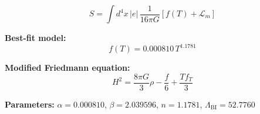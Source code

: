 
\begin{equation}
  S = \int d^4x \, |e| \, \frac{1}{16\pi G} \left[ f(T) + \mathcal{L}_m \right]
\end{equation}

\textbf{Best-fit model:}
\begin{equation}
  f(T) = 0.000810 \, T^{1.1781}
\end{equation}

\textbf{Modified Friedmann equation:}
\begin{equation}
  H^2 = \frac{8\pi G}{3} \rho - \frac{f}{6} + \frac{T f_T}{3}
\end{equation}

\textbf{Parameters:}
$\alpha = 0.000810$, \quad
$\beta = 2.039596$, \quad
$n = 1.1781$, \quad
$\Lambda_{\text{BI}} = 52.7760$